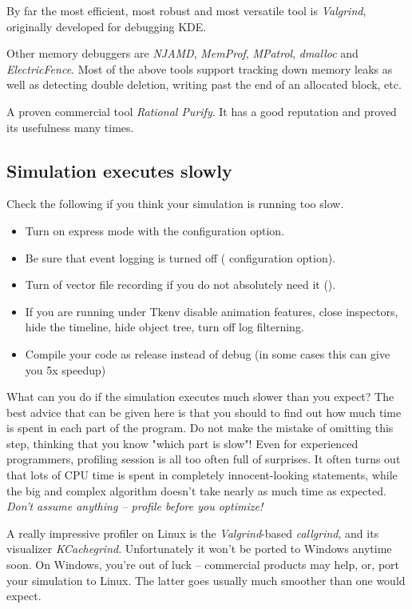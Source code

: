 By far the most efficient, most robust and most versatile tool
is \textit{Valgrind}, originally developed for debugging KDE.

Other memory debuggers are \textit{NJAMD}, \textit{MemProf},
\textit{MPatrol}, \textit{dmalloc} and \textit{ElectricFence}.
Most of the above tools support tracking down memory leaks as well as
detecting double deletion, writing past the end of an allocated block, etc.

A proven commercial tool \textit{Rational Purify}. It has
a good reputation and proved its usefulness many times.

\subsection{Simulation executes slowly}

Check the following if you think your simulation is running too slow.

\begin{itemize}
  \item Turn on express mode with the  configuration option.
  \item Be sure that event logging is turned off ( configuration option).
  \item Turn of vector file recording if you do not absolutely need it ().
  \item If you are running under Tkenv disable animation features, close inspectors, 
        hide the timeline, hide object tree, turn off log filterning.
  \item Compile your code as release instead of debug (in some cases this can give you 5x speedup)
\end{itemize}


What can you do if the simulation executes much slower than you expect?
The best advice that can be given here is that you should
 to find out how much time is spent in each
part of the program. Do not make the mistake of omitting this step,
thinking that you know "which part is slow"! Even for experienced
programmers, profiling session is all too often full of surprises.
It often turns out that lots of CPU time is spent in completely
innocent-looking statements, while the big and complex algorithm
doesn't take nearly as much time as expected. \textit{Don't assume anything
-- profile before you optimize!}

A really impressive profiler on Linux is the \textit{Valgrind}-based
\textit{callgrind}, and its visualizer \textit{KCachegrind}.
Unfortunately it won't be ported to Windows anytime soon.
On Windows, you're out of luck -- commercial products may help, or,
port your simulation to Linux. The latter goes usually much smoother
than one would expect.


